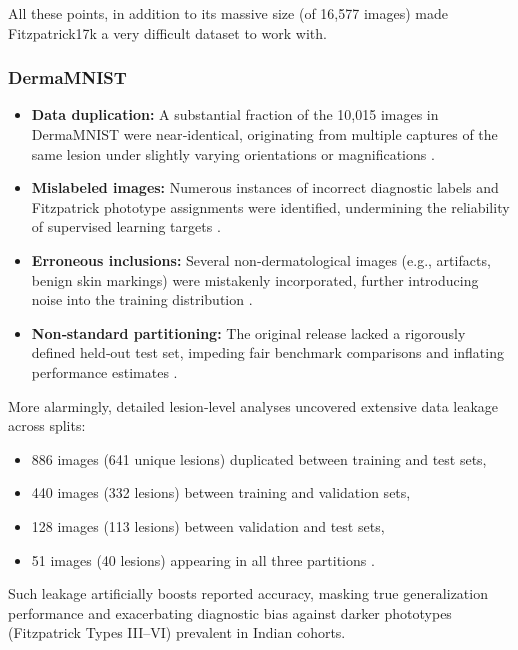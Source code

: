 All these points, in addition to its massive size (of 16,577 images) made Fitzpatrick17k a very difficult dataset to work with.

\subsubsection{DermaMNIST}

\begin{itemize}
  \item \textbf{Data duplication:} A substantial fraction of the 10,015 images in DermaMNIST were near‐identical, originating from multiple captures of the same lesion under slightly varying orientations or magnifications \cite{pakzad}.
  \item \textbf{Mislabeled images:} Numerous instances of incorrect diagnostic labels and Fitzpatrick phototype assignments were identified, undermining the reliability of supervised learning targets \cite{abhi}.
  \item \textbf{Erroneous inclusions:} Several non‐dermatological images (e.g., artifacts, benign skin markings) were mistakenly incorporated, further introducing noise into the training distribution \cite{pakzad,abhi}.
  \item \textbf{Non‐standard partitioning:} The original release lacked a rigorously defined held‐out test set, impeding fair benchmark comparisons and inflating performance estimates \cite{abhi}.
\end{itemize}

More alarmingly, detailed lesion‐level analyses uncovered extensive data leakage across splits:

\begin{itemize}
  \item 886 images (641 unique lesions) duplicated between training and test sets,
  \item 440 images (332 lesions) between training and validation sets,
  \item 128 images (113 lesions) between validation and test sets,
  \item 51 images (40 lesions) appearing in all three partitions \cite{pakzad}.
\end{itemize}

Such leakage artificially boosts reported accuracy, masking true generalization performance and exacerbating diagnostic bias against darker phototypes (Fitzpatrick Types III–VI) prevalent in Indian cohorts.  \par

